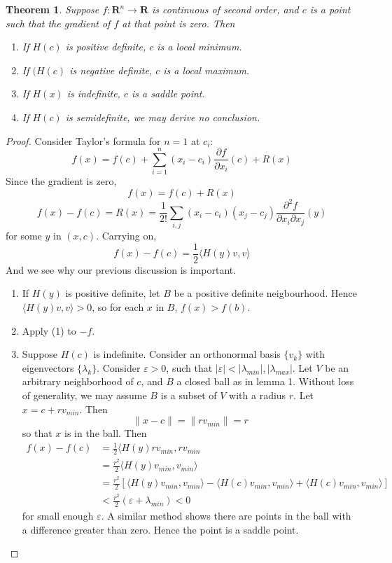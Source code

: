 \documentclass[12pt]{amsbook}
\theoremstyle{plain}
\newtheorem{theorem}{Theorem}
\theoremstyle{definition}
\begin{document}
\begin{theorem}
    Suppose $f:\mathbf{R}^n \to \mathbf{R}$ is continuous of second order, and $c$ is a point such that the gradient of $f$ at that point is zero. Then
    \begin{enumerate}
        \item If $H(c)$ is positive definite, $c$ is a local minimum.
        \item If $(H(c)$ is negative definite, $c$ is a local maximum.
        \item If $H(x)$ is indefinite, $c$ is a saddle point.
        \item If $H(c)$ is semidefinite, we may derive no conclusion.
    \end{enumerate}
\end{theorem}
\begin{proof}
    Consider Taylor's formula for $n = 1$ at $c_i$:
    \[ f(x) = f(c) + \sum_{i = 1}^n (x_i - c_i) \frac{\partial f}{\partial x_i}(c) + R(x) \]
    Since the gradient is zero,
    \[ f(x) = f(c) + R(x) \]
    \[ f(x) - f(c) = R(x) = \frac{1}{2!} \sum_{i,j} (x_i - c_i)(x_j - c_j) \frac{\partial^2 f}{\partial x_i \partial x_j} (y) \]
    for some $y$ in $(x,c)$. Carrying on,
    \[ f(x) - f(c) = \frac{1}{2} \langle H(y)v, v \rangle \]
    And we see why our previous discussion is important.
    \begin{enumerate}
        \item If $H(y)$ is positive definite, let $B$ be a positive definite neigbourhood. Hence $\langle H(y)v, v \rangle > 0$, so for each $x$ in $B$, $f(x) > f(b)$.
        \item Apply (1) to $-f$.
        \item Suppose $H(c)$ is indefinite. Consider an orthonormal basis $\{ v_k \}$ with eigenvectors $\{ \lambda_k \}$. Consider $\varepsilon > 0$, such that $|\varepsilon| < |\lambda_{min}|,|\lambda_{max}|$. Let $V$ be an arbitrary neighborhood of $c$, and $B$ a closed ball as in lemma 1. Without loss of generality, we may assume $B$ is a subset of $V$ with a radius $r$. Let $x = c + r v_{min}$. Then
        \[ \|x - c\| = \|r v_{min} \| = r \]
        so that $x$ is in the ball. Then
        \begin{align*}
            f(x) - f(c) &= \frac{1}{2} \langle H(y)r v_{min}, r v_{min}\\
            &= \frac{r^2}{2} \langle H(y) v_{min}, v_{min} \rangle\\
            &= \frac{r^2}{2} [\langle H(y) v_{min}, v_{min} \rangle - \langle H(c) v_{min}, v_{min} \rangle + \langle H(c) v_{min}, v_{min} \rangle]\\
            &< \frac{r^2}{2} (\varepsilon + \lambda_{min}) < 0
        \end{align*}
        for small enough $\varepsilon$. A similar method shows there are points in the ball with a difference greater than zero. Hence the point is a saddle point.
    \end{enumerate}
\end{proof}
\end{document}
